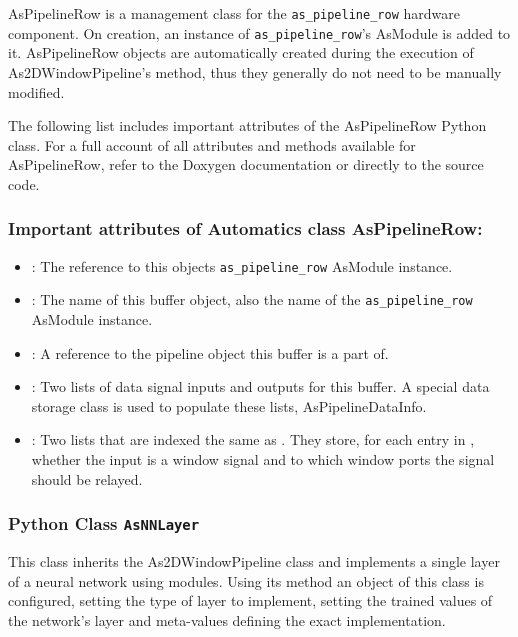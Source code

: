 AsPipelineRow is a management class for the \texttt{as\_pipeline\_row} hardware component.
On creation, an instance of \texttt{as\_pipeline\_row}'s AsModule is added to it.
AsPipelineRow objects are automatically created during the execution of As2DWindowPipeline's  method, thus they generally do not need to be manually modified.

The following list includes important attributes of the AsPipelineRow Python class.
For a full account of all attributes and methods available for AsPipelineRow, refer to the Doxygen documentation or directly to the source code.

\subsubsection*{Important attributes of Automatics class AsPipelineRow:}
\begin{itemize}
\item {}: The reference to this objects \texttt{as\_pipeline\_row} AsModule instance.
\item {}: The name of this buffer object, also the name of the \texttt{as\_pipeline\_row} AsModule instance.
\item {}: A reference to the pipeline object this buffer is a part of.
\item {}: Two lists of data signal inputs and outputs for this buffer. A special data storage class is used to populate these lists, AsPipelineDataInfo.
\item {}: Two lists that are indexed the same as . They store, for each entry in , whether the input is a window signal and to which window ports the signal should be relayed.
\end{itemize}


\subsubsection{Python Class \texttt{AsNNLayer}}

This class inherits the As2DWindowPipeline class and implements a single layer of a neural network using \asterics modules.
Using its method  an object of this class is configured, setting the type of layer to implement, setting the trained values of the network's layer and meta-values defining the exact implementation.

